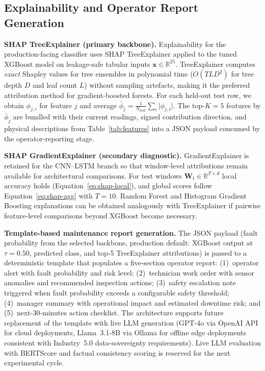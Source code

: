 \documentclass[sensors,article,submit,pdftex,moreauthors]{Definitions/mdpi}
\begin{document}
\subsection{Explainability and Operator Report Generation}
\label{sec:method_shap}

\textbf{SHAP TreeExplainer (primary backbone).}
Explainability for the production-facing classifier uses SHAP
TreeExplainer \citep{ref-shap-lundberg} applied to the tuned XGBoost
model on leakage-safe tabular inputs $\mathbf{x} \in \mathbb{R}^{25}$.
TreeExplainer computes \emph{exact} Shapley values for tree ensembles
in polynomial time ($O(TLD^2)$ for tree depth $D$ and leaf count $L$)
without sampling artefacts, making it the preferred attribution method
for gradient-boosted forests.
For each held-out test row, we obtain $\phi_{j,i}$ for feature $j$
and average $\bar{\phi}_j = \frac{1}{N_\text{test}} \sum_i
\lvert \phi_{j,i}\rvert$.
The top-$K = 5$ features by $\bar{\phi}_j$ are bundled with their
current readings, signed contribution direction, and physical
descriptions from Table~\ref{tab:features} into a JSON payload consumed
by the operator-reporting stage.

\textbf{SHAP GradientExplainer (secondary diagnostic).}
GradientExplainer \citep{ref-shap-lundberg} is retained for the CNN--LSTM
branch so that window-level attributions remain available for
architectural comparisons.
For test windows $\mathbf{W}_t \in \mathbb{R}^{T \times d}$ local
accuracy holds (Equation~\ref{eq:shap-local}), and global scores
follow Equation~\ref{eq:shap-agg} with $T=10$.
Random Forest and Histogram Gradient Boosting explanations can be
obtained analogously with TreeExplainer if pairwise feature-level
comparisons beyond XGBoost become necessary.

\textbf{Template-based maintenance report generation.}
The JSON payload (fault probability from the selected backbone,
production default: XGBoost output at $\tau = 0.50$, predicted
class, and top-5 TreeExplainer attributions) is passed to a
deterministic template that populates a five-section operator
report: (1)~operator alert with fault probability and risk level;
(2)~technician work order with sensor anomalies and recommended
inspection actions; (3)~safety escalation note triggered when fault
probability exceeds a configurable safety threshold; (4)~manager
summary with operational impact and estimated downtime risk; and
(5)~next-30-minutes action checklist.
The architecture supports future replacement of the template with
live LLM generation (GPT-4o via OpenAI API for cloud deployments,
Llama~3.1-8B via Ollama for offline edge deployments consistent
with Industry~5.0 data-sovereignty requirements).
Live LLM evaluation with BERTScore \citep{ref-bertscore2020} and
factual consistency scoring is reserved for the next experimental
cycle.
\end{document}
